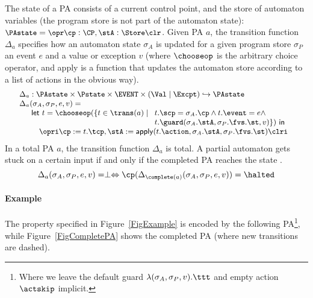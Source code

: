 The state of a PA consists of a current control point, and the store of
automaton variables (the program store is not part of the automaton state):
\({\small
\PAstate = \opr \cp : \CP, \stA : \Store \clr}
\). Given PA \(a\), the transition function \(\Delta_a\) specifies how
an automaton state \(\sigma_A\) is updated for a given program store
\(\sigma_P\) an event \(e\) and a value or exception \(v\) (where
\(\chooseop\) is the arbitrary choice operator, and \textsf{apply} is
a function that updates the automaton store according to a list of
actions in the obvious way).
\[{\small
\begin{array}{l}
\Delta_a  :  \PAstate \times \Pstate \times \EVENT \times (\Val \mid
\Excpt) \hookrightarrow
\PAstate\\
\Delta_a(\sigma_A, \sigma_P, e, v) = \\
\quad
\begin{array}[t]{l}
\mathsf{let\ }t = \chooseop(\{t\in \trans(a)\mid
  \begin{array}[t]{l}
     t.\scp = \sigma_A.\cp \wedge t.\event = e \wedge \\
     t.\guard(\sigma_A.\stA, \sigma_P.\fvs.\st, v)\}) \mathsf{\ in}
  \end{array}\\
\quad \opri \cp := t.\tcp, \stA := \mathsf{apply}(t.\action,
\sigma_A.\stA, \sigma_P.\fvs.\st) \clri
\end{array}

\end{array}}
\]
In a total PA $a$, the transition function \(\Delta_a\) is total.
A partial automaton gets stuck on a certain input if and only if the
completed PA reaches the state \halted.
\vspace*{-.5em}
\begin{equation}\label{PAcompletionProp}
\Delta_a(\sigma_A, \sigma_P, e, v) = \perp \Leftrightarrow
\cp (\Delta_{\complete(a)}(\sigma_A, \sigma_P, e, v)) = \halted
\end{equation}


\paragraph{Example}
The property specified in Figure~\ref{FigExample} is encoded by the
following PA\footnote{Where we leave the default guard
\(\lambda(\sigma_A, \sigma_P, v). \ttt\) and  empty action
\(\actskip\) implicit.}, while Figure~\ref{FigCompletePA} shows the
completed PA (where new transitions are dashed).

